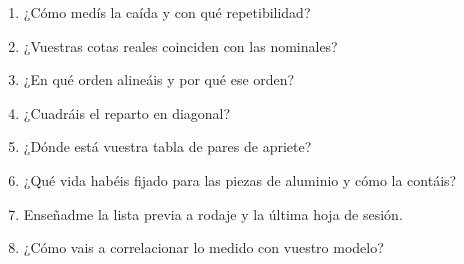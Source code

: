 \begin{juez}
\begin{enumerate}
  \item ¿Cómo medís la caída y con qué repetibilidad?
  \item ¿Vuestras cotas reales coinciden con las nominales?
  \item ¿En qué orden alineáis y por qué ese orden?
  \item ¿Cuadráis el reparto en diagonal?
  \item ¿Dónde está vuestra tabla de pares de apriete?
  \item ¿Qué vida habéis fijado para las piezas de aluminio y cómo la contáis?
  \item Enseñadme la lista previa a rodaje y la última hoja de sesión.
  \item ¿Cómo vais a correlacionar lo medido con vuestro modelo?
\end{enumerate}
\end{juez}
